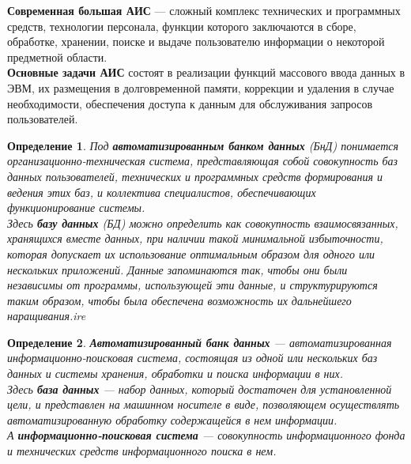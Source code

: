 \documentclass{article}
\newtheorem{definition}{Определение}
\begin{document}
\textbf{Современная большая АИС} — сложный комплекс технических и программных средств, технологии персонала, функции которого заключаются в сборе, обработке, хранении, поиске и выдаче пользователю информации о некоторой предметной области. \\[1 mm]

\textbf{Основные задачи АИС} состоят в реализации функций массового ввода данных в ЭВМ, их размещения в долговременной памяти, коррекции и удаления в случае необходимости, обеспечения доступа к данным для обслуживания запросов пользователей. \\[1 mm]

\begin{definition}

Под \textbf{автоматизированным банком данных} (БнД) понимается организационно-техническая система, представляющая собой совокупность баз данных пользователей, технических и программных средств формирования и ведения этих баз, и коллектива специалистов, обеспечивающих функционирование системы. \\[1mm]

Здесь \textbf{базу данных} (БД) можно определить как совокупность взаимосвязанных, хранящихся вместе данных, при наличии такой минимальной избыточности, которая допускает их использование оптимальным образом для одного или нескольких приложений. Данные запоминаются так, чтобы они были независимы от программы, использующей эти данные, и структурируются таким образом, чтобы была обеспечена возможность их дальнейшего наращивания.ire

\end{definition}

\begin{definition}

\textbf{Автоматизированный банк данных} — автоматизированная информационно-поисковая система, состоящая из одной или нескольких баз данных и системы хранения, обработки и поиска информации в них. \\[1mm]

Здесь \textbf{база данных} — набор данных, который достаточен для установленной цели, и представлен на машинном носителе в виде, позволяющем осуществлять автоматизированную обработку содержащейся в нем информации. \\[1mm]

А \textbf{информационно-поисковая система} — совокупность информационного фонда и технических средств информационного поиска в нем.

\end{definition}
\end{document}
